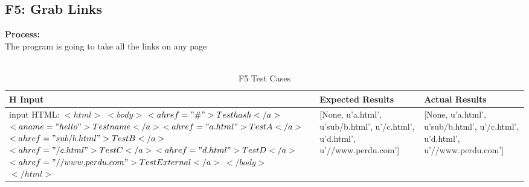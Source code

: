 \documentclass[12pt, titlepage]{article}
\begin{document}
\subsection{F5: Grab Links}
\textbf{Process:}\\
The program is going to take all the links on any page\\\\
\begin{table}[h!]
\centering
\begin{tabular}{ p{7cm}  p{4cm}  p{4cm} }{H}
	Input &Expected Results &Actual Results\\ \hline
        input HTML: 
        ${<html>}$
    	${<body>}$
       ${ <a href="\#">Test hash</a>}$
       ${ <a name="hello">Test name</a>}$
      ${ <a href="a.html">Test A</a>}$
     ${   <a href="sub/b.html">Test B</a>}$
      ${  <a href="/c.html">Test C</a>}$
    ${    <a href="d.html">Test D</a>}$
    ${    <a href="//www.perdu.com">Test External</a>}$
    ${    </body>}$
     ${   </html>}$
	&[None, u'a.html', u'sub/b.html', u'/c.html', u'd.html', u'//www.perdu.com']& [None, u'a.html', u'sub/b.html', u'/c.html', u'd.html', u'//www.perdu.com']\\ \hline
\end{tabular}
\caption{F5 Test Cases}
\label{table:F5 Test Cases}
\end{table}
\pagebreak
\end{document}
